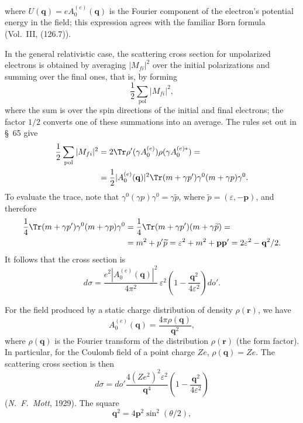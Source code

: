 where $U(\mathbf q)=eA_0^{(e)}(\mathbf q)$ is the Fourier component of the electron's potential energy in the field; this expression agrees with the familiar Born formula (Vol.~III, (126.7)).

In the general relativistic case, the scattering cross section for unpolarized electrons is obtained by averaging $|M_{fi}|^2$ over the initial polarizations and summing over the final ones, that is, by forming
\[
\frac{1}{2}\sum_{\text{pol}}|M_{fi}|^2,
\]
where the sum is over the spin directions of the initial and final electrons; the factor $1/2$ converts one of these summations into an average. The rules set out in \S~65 give
\[
\begin{aligned}
\frac{1}{2}\sum_{\text{pol}}|M_{fi}|^2
&=2\Tr\rho'(\gamma A_0^{(e)})\rho(\gamma A_0^{(e)*})=\\
&=\frac{1}{2}|A_0^{(e)}(\mathbf q)|^2
\Tr(m+\gamma p')\gamma^0(m+\gamma p)\gamma^0.
\end{aligned}
\]
To evaluate the trace, note that $\gamma^0(\gamma p)\gamma^0=\gamma\widetilde p$, where $\widetilde p=(\varepsilon,-\mathbf p)$, and therefore
\[
\begin{aligned}
\frac{1}{4}\Tr(m+\gamma p')\gamma^0(m+\gamma p)\gamma^0
&=\frac{1}{4}\Tr(m+\gamma p')(m+\gamma\widetilde p)=\\
&=m^2+p'\widetilde p=\varepsilon^2+m^2+\mathbf p\mathbf p'
=2\varepsilon^2-\mathbf q^2/2.
\end{aligned}
\]
It follows that the cross section is
\begin{equation}
d\sigma=\frac{e^2|A_0^{(e)}(\mathbf q)|^2}{4\pi^2}\,
\varepsilon^2\left(1-\frac{\mathbf q^2}{4\varepsilon^2}\right)do'.
\tag{80.5}
\end{equation}

For the field produced by a static charge distribution of density $\rho(\mathbf r)$, we have
\begin{equation}
A_0^{(e)}(\mathbf q)=\frac{4\pi\rho(\mathbf q)}{\mathbf q^2},
\tag{80.6}
\end{equation}
where $\rho(\mathbf q)$ is the Fourier transform of the distribution $\rho(\mathbf r)$ (the form factor). In particular, for the Coulomb field of a point charge $Ze$, $\rho(\mathbf q)=Ze$. The scattering cross section is then
\begin{equation}
d\sigma=do'\frac{4(Ze^2)^2\varepsilon^2}{\mathbf q^4}
\left(1-\frac{\mathbf q^2}{4\varepsilon^2}\right)
\tag{80.7}
\end{equation}
(\emph{N.~F.~Mott}, 1929). The square
\[
\mathbf q^2=4\mathbf p^2\sin^2(\theta/2),
\]

